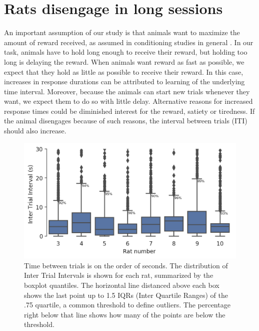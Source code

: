 \section{Rats disengage in long sessions}
    An important assumption of our study is that animals want to maximize the amount of reward received, as assumed in conditioning studies in general \cite{}. In our task, animals have to hold long enough to receive their reward, but holding too long is delaying the reward. When animals want reward as fast as possible, we expect that they hold as little as possible to receive their reward. In this case, increases in response durations can be attributed to learning of the underlying time interval. Moreover, because the animals can start new trials whenever they want, we expect them to do so with little delay. Alternative reasons for increased response times could be diminished interest for the reward, satiety or tiredness. If the animal disengages because of such reasons, the interval between trials (ITI) should also increase.

    \begin{figure}[h]
        \centering
        \includegraphics[width=\textwidth]{figures/inter_trial_boxplot.png}
        \caption[Time between trials is on the order of seconds]{Time between trials is on the order of seconds. The distribution of Inter Trial Intervals is shown for each rat, summarized by the boxplot quantiles. The horizontal line distanced above each box shows the last point up to 1.5 IQRs (Inter Quartile Ranges) of the .75 quartile, a common threshold to define outliers. The percentage right below that line shows how many of the points are below the threshold.}
        \label{fig:iti_box}
    \end{figure}
    
